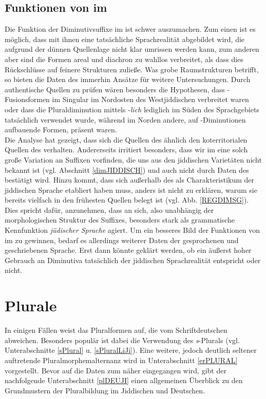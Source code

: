  \subsection{Funktionen von  im  }\label{DIMFunktionen}
   Die Funktion der Diminutivsuffixe im  ist schwer auszumachen. Zum einen ist es möglich, dass mit ihnen  eine tatsächliche Sprachrealität abgebildet wird, die aufgrund der dünnen Quellenlage nicht klar umrissen werden kann, zum anderen aber sind die Formen areal und diachron zu wahllos verbreitet, als dass dies Rückschlüsse auf feinere Strukturen zuließe. Was grobe Raumstrukturen betrifft, so bieten die Daten des  immerhin Ansätze für weitere Untersuchungen. Durch authentische Quellen zu prüfen wären besonders die Hypothesen, dass -Fusionsformen im Singular im Nordosten des Westjiddischen verbreitet waren oder dass die Pluraldiminution mittels -\textit{lich} lediglich im Süden des Sprachgebiets tatsächlich verwendet wurde, während im Norden andere, auf -Diminutionen aufbauende Formen, präsent waren.\\


Die Analyse hat gezeigt, dass sich die Quellen des   ähnlich den koterritorialen Quellen des  verhalten. Andererseits irritiert besonders, dass wir im  eine solch große Variation an Suffixen vorfinden, die uns aus den jiddischen Varietäten nicht bekannt ist (vgl. Abschnitt \ref{dimJIDDISCH}) und auch nicht durch Daten des  bestätigt wird. Hinzu kommt, dass sich  außerhalb des  als Charakteristikum der jiddischen Sprache etabliert haben muss, anders ist nicht zu erklären, warum sie bereits vielfach in den frühesten Quellen belegt ist (vgl. Abb. \ref{REGDIMSG}). Dies spricht dafür, anzunehmen, dass  an sich, also unabhängig der morphologischen Struktur des Suffixes, besonders stark als grammatische Kennfunktion \textit{jüdischer Sprache} agiert. Um ein besseres Bild der Funktionen von  im  zu gewinnen, bedarf es allerdings weiterer Daten der gesprochenen und geschriebenen Sprache. Erst dann könnte geklärt werden, ob ein äußerst hoher Gebrauch an Diminutiva tatsächlich der jiddischen Sprachrealität entspricht oder nicht. 

 \section{Plurale}\label{pl}
In einigen Fällen weist das  Pluralformen auf, die vom Schriftdeutschen abweichen. Besonders populär ist dabei die Verwendung des  \textit{s}-Plurals (vgl. Unterabschnitte \ref{sPlural} u. \ref{sPluralLiJi}). Eine weitere, jedoch deutlich seltener auftretende Pluralmorphemalternanz wird in Unterabschnitt \ref{erPLURAL} vorgestellt. Bevor auf die Daten zum  näher eingegangen wird, gibt der nachfolgende Unterabschnitt \ref{plDEUJI} einen allgemeinen Überblick zu den Grundmustern der Pluralbildung im Jiddischen und Deutschen. \\


